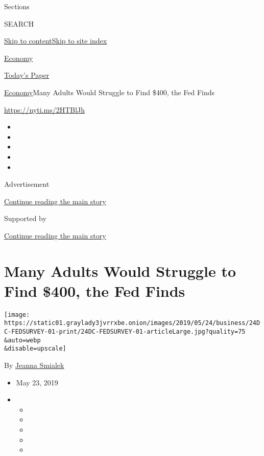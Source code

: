 Sections

SEARCH

\protect\hyperlink{site-content}{Skip to
content}\protect\hyperlink{site-index}{Skip to site index}

\href{https://www.nytimes3xbfgragh.onion/section/business/economy}{Economy}

\href{https://myaccount.nytimes3xbfgragh.onion/auth/login?response_type=cookie\&client_id=vi}{}

\href{https://www.nytimes3xbfgragh.onion/section/todayspaper}{Today's
Paper}

\href{/section/business/economy}{Economy}\textbar{}Many Adults Would
Struggle to Find \$400, the Fed Finds

\url{https://nyti.ms/2HTBlJh}

\begin{itemize}
\item
\item
\item
\item
\item
\end{itemize}

Advertisement

\protect\hyperlink{after-top}{Continue reading the main story}

Supported by

\protect\hyperlink{after-sponsor}{Continue reading the main story}

\hypertarget{many-adults-would-struggle-to-find-400-the-fed-finds}{%
\section{Many Adults Would Struggle to Find \$400, the Fed
Finds}\label{many-adults-would-struggle-to-find-400-the-fed-finds}}

\texttt{[image: https://static01.graylady3jvrrxbe.onion/images/2019/05/24/business/24DC-FEDSURVEY-01-print/24DC-FEDSURVEY-01-articleLarge.jpg?quality=75\\\&auto=webp\\\&disable=upscale]}

By \href{https://www.nytimes3xbfgragh.onion/by/jeanna-smialek}{Jeanna
Smialek}

\begin{itemize}
\item
  May 23, 2019
\item
  \begin{itemize}
  \item
  \item
  \item
  \item
  \item
  \end{itemize}
\end{itemize}

